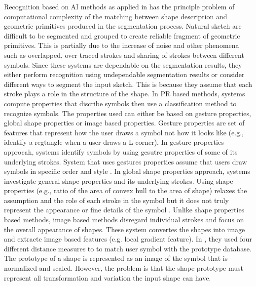 \documentclass[preprint,10pt,5p,twocolumn]{elsarticle}
\begin{document}
Recognition based on AI methods as applied in \cite{SketchRead2007} has the principle problem of computational complexity of the matching between shape description and geometric primitives produced in the segmentation process. Natural sketch are difficult to be segmented and grouped to create reliable fragment of geometric primitives. This is partially due to the increase of noise and other phenomena such as overlapped, over traced strokes and sharing of strokes between different symbols. Since these systems are dependable on the segmentation results, they either perform recognition using undependable segmentation results or consider different ways to segment the input sketch. This is because they assume that each stroke plays a role in the structure of the shape. 
In PR based methods, systems compute properties that discribe symbols then use a classification method to recognize symbols. The properties used can either be based on gesture properties, global shape properties or image based properties. Gesture properties are set of features that represent how the user draws a symbol not how it looks like (e.g., identify a regtangle when a user draws a L corner). In gesture properties approcah, systems identify symbols by using gesutre properties of some of its  underlying strokes. System that uses gestures properties assume that users draw symbols in specific order and style \cite{gestureexample12,aideddesgin22}. In global shape properties approach, systems investigate general shape properties and its underlying strokes. Using shape properties (e.g., ratio of the area of convex hull to the area of shape) relaxes the assumption and the role of each stroke in the symbol but it does not truly represent the appearance or fine details of the symbol \cite{DiagramOfflineConvexHull,Cali63}. Unlike shape properties based methods, image based methods disregard individual strokes and focus on the overall appearance of shapes. These system convertes the shapes into image and extracte image based features (e.g. local gradient feature)\cite{Oltmans07,imagetrainable48}. In \cite{imagetrainable48}, they used four different distance measures to to match user symbol with the prototype database. The prototype of a shape is represented as an image of the symbol that is normalized and scaled.  However, the problem is that the shape prototype must represent all transformation and variation the input shape can have.   %
\end{document}
